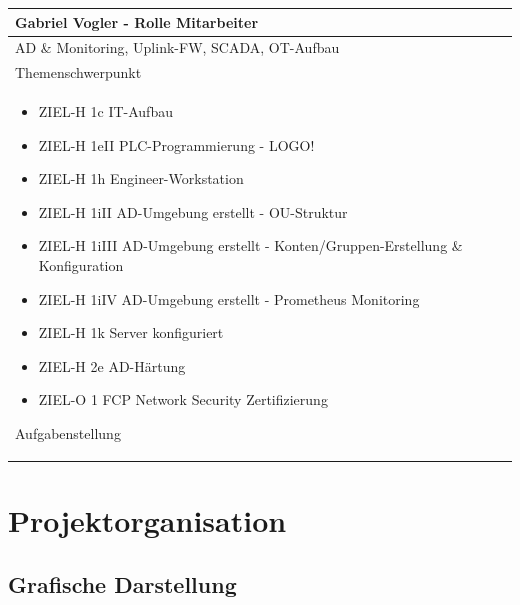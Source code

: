 \documentclass[
	headings=optiontotocandhead,%
	oneside,
	numbers=noenddot,%
	toc=flat, %
	10pt, %
	parskip=full, %
	listof=totoc, %
	listof=flat, %
	numbers=noenddot, %
	bibliography=totoc, %
	a4paper,DIV=14,
]{scrartcl}
\begin{document}
\begin{table}[H]
	\begin{tabularx} {\textwidth} {
			|>{\hsize=1\hsize}X|
		}
		
		\hline
		\rowcolor[HTML]{D9D9D9} 
		\rule{0pt}{15pt}
		\textbf{\normalsize{Gabriel Vogler - Rolle Mitarbeiter}} \\ \hline
		
		\rule{0pt}{20pt} AD \& Monitoring, Uplink-FW, SCADA, OT-Aufbau \\
		\rule{0pt}{11pt}\textcolor[HTML]{A6A6A6}{\footnotesize{Themenschwerpunkt}} \\ \hline
		
		\begin{itemize}[itemsep=0pt, parsep=0pt, topsep=0pt]
			\item{ZIEL-H 1c IT-Aufbau}
			\item{ZIEL-H 1eII PLC-Programmierung - LOGO!}
			\item{ZIEL-H 1h Engineer-Workstation}
			\item{ZIEL-H 1iII AD-Umgebung erstellt - OU-Struktur}
			\item{ZIEL-H 1iIII AD-Umgebung erstellt - Konten/Gruppen-Erstellung \& Konfiguration}
			\item{ZIEL-H 1iIV AD-Umgebung erstellt - Prometheus Monitoring}
			\item{ZIEL-H 1k Server konfiguriert}
			\item{ZIEL-H 2e AD-Härtung}
			\item{ZIEL-O 1 FCP Network Security Zertifizierung}
		\end{itemize}
		
		\rule{0pt}{11pt}\textcolor[HTML]{A6A6A6}{\footnotesize{Aufgabenstellung}} \\ \hline
	\end{tabularx}
\end{table}

\newpage
\section{Projektorganisation}
\subsection{Grafische Darstellung}
\end{document}
